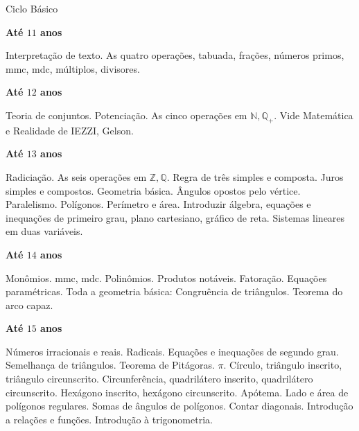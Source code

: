 \documentclass[12pt,a4paper]{article}
\begin{document}
\Large

Ciclo B\'asico

\normalsize

\vspace{6mm}

\textbf{At\'e $11$ anos}

Interpreta\c{c}\~ao de texto. As quatro opera\c{c}\~oes, tabuada, fra\c{c}\~oes, n\'umeros primos, mmc, mdc, m\'ultiplos, divisores.

\vspace{6mm}

\textbf{At\'e $12$ anos}

Teoria de conjuntos. Potencia\c{c}\~ao. As cinco opera\c{c}\~oes em $\mathbb{N}, \mathbb{Q}_+$. Vide Matem\'atica e Realidade de IEZZI, Gelson.

\vspace{6mm}

\textbf{At\'e $13$ anos}

Radicia\c{c}\~ao. As seis opera\c{c}\~oes em $\mathbb{Z}, \mathbb{Q}$. Regra de tr\^es simples e composta. Juros simples e compostos. Geometria b\'asica. \^Angulos opostos pelo v\'ertice. Paralelismo. Pol\'igonos. Per\'imetro e \'area. Introduzir \'algebra, equa\c{c}\~oes e inequa\c{c}\~oes de primeiro grau, plano cartesiano, gr\'afico de reta. Sistemas lineares em duas vari\'aveis.

\vspace{6mm}

\textbf{At\'e $14$ anos}

Mon\^omios. mmc, mdc. Polin\^omios. Produtos not\'aveis. Fatora\c{c}\~ao. Equa\c{c}\~oes param\'etricas. Toda a geometria b\'asica: Congru\^encia de tri\^angulos. Teorema do arco capaz.

\vspace{6mm}

\textbf{At\'e $15$ anos}

N\'umeros irracionais e reais. Radicais. Equa\c{c}\~oes e inequa\c{c}\~oes de segundo grau. Semelhan\c{c}a de tri\^angulos. Teorema de Pit\'agoras. $\pi$. C\'irculo, tri\^angulo inscrito, tri\^angulo circunscrito. Circunfer\^encia, quadril\'atero inscrito, quadril\'atero circunscrito. Hex\'agono inscrito, hex\'agono circunscrito. Ap\'otema. Lado e \'area de pol\'igonos regulares. Somas de \^angulos de pol\'igonos. Contar diagonais. Introdu\c{c}\~ao a rela\c{c}\~oes e fun\c{c}\~oes. Introdu\c{c}\~ao \`a trigonometria.

\vspace{6mm}
\end{document}
